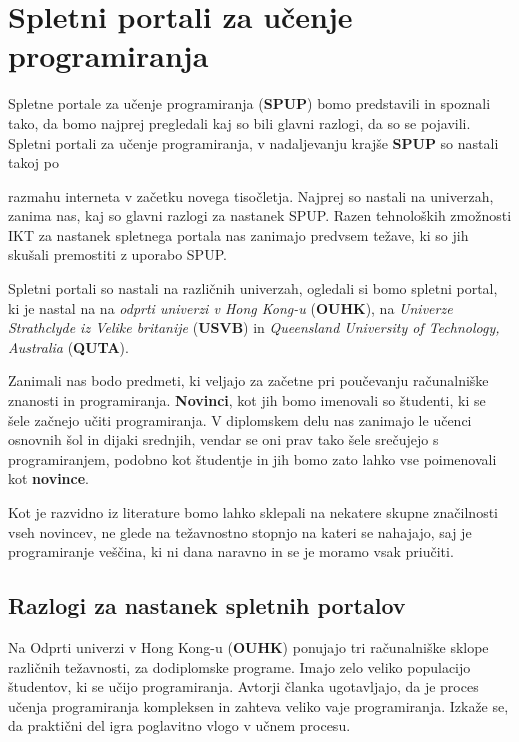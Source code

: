\section{Spletni portali za učenje programiranja}
\label{sec:SPUP}

Spletne portale za učenje programiranja (\textbf{SPUP}) bomo
predstavili in spoznali tako, da bomo najprej pregledali kaj so bili
glavni razlogi, da so se pojavili. Spletni portali za učenje
programiranja, v nadaljevanju krajše \textbf{SPUP} so nastali takoj po

razmahu interneta v začetku novega tisočletja. Najprej so nastali na
univerzah, zanima nas, kaj so glavni razlogi za nastanek SPUP. Razen
tehnoloških zmožnosti IKT za nastanek spletnega portala nas zanimajo
predvsem težave, ki so jih skušali premostiti z uporabo SPUP.

Spletni portali so nastali na različnih univerzah, ogledali si bomo
spletni portal, ki je nastal na na \emph{odprti univerzi v Hong
  Kong-u} (\textbf{OUHK}), na \emph{Univerze Strathclyde iz Velike
  britanije} (\textbf{USVB}) in \emph{Queensland University of
  Technology, Australia} (\textbf {QUTA}).

Zanimali nas bodo predmeti, ki veljajo za začetne pri poučevanju
računalniške znanosti in programiranja. \textbf{Novinci}, kot jih bomo
imenovali so študenti, ki se šele začnejo učiti programiranja. V
diplomskem delu nas zanimajo le učenci osnovnih šol in dijaki
srednjih, vendar se oni prav tako šele srečujejo s programiranjem,
podobno kot študentje in jih bomo zato lahko vse poimenovali kot
\textbf{novince}.

Kot je razvidno iz literature bomo lahko sklepali na nekatere skupne
značilnosti vseh novincev, ne glede na težavnostno stopnjo na kateri
se nahajajo, saj je programiranje veščina, ki ni dana naravno in se je
moramo vsak priučiti.




\subsection{Razlogi za nastanek spletnih portalov}
\label{sec:razlogi_za_nastanek_SPUP}

Na Odprti univerzi v Hong Kong-u (\textbf{OUHK}) ponujajo tri
računalniške sklope različnih težavnosti, za dodiplomske
programe. Imajo zelo veliko populacijo študentov, ki se učijo
programiranja. Avtorji članka \cite{ITaLCP_DistanceEdu}
ugotavljajo, da je proces učenja programiranja kompleksen in zahteva
veliko vaje programiranja. Izkaže se, da praktični
del igra poglavitno vlogo v učnem procesu.

